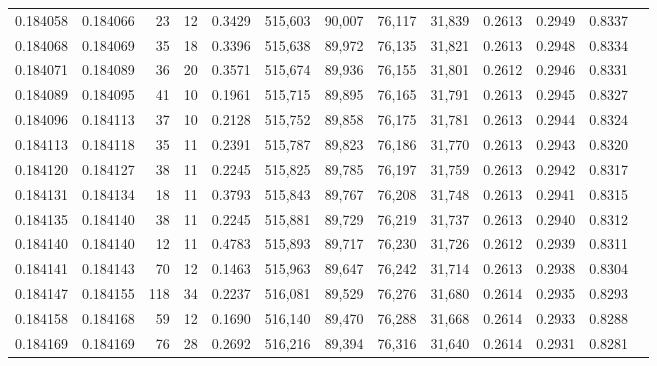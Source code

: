 \begin{tabular}{rrrrrrrrrrrrr}
0.184058 & 0.184066 &    23 &  12 &                                     0.3429 & 515,603 &  90,007 &  76,117 &  31,839 & 0.2613 & 0.2949 & 0.8337 \\
0.184068 & 0.184069 &    35 &  18 &                                     0.3396 & 515,638 &  89,972 &  76,135 &  31,821 & 0.2613 & 0.2948 & 0.8334 \\
0.184071 & 0.184089 &    36 &  20 &                                     0.3571 & 515,674 &  89,936 &  76,155 &  31,801 & 0.2612 & 0.2946 & 0.8331 \\
0.184089 & 0.184095 &    41 &  10 &                                     0.1961 & 515,715 &  89,895 &  76,165 &  31,791 & 0.2613 & 0.2945 & 0.8327 \\
0.184096 & 0.184113 &    37 &  10 &                                     0.2128 & 515,752 &  89,858 &  76,175 &  31,781 & 0.2613 & 0.2944 & 0.8324 \\
0.184113 & 0.184118 &    35 &  11 &                                     0.2391 & 515,787 &  89,823 &  76,186 &  31,770 & 0.2613 & 0.2943 & 0.8320 \\
0.184120 & 0.184127 &    38 &  11 &                                     0.2245 & 515,825 &  89,785 &  76,197 &  31,759 & 0.2613 & 0.2942 & 0.8317 \\
0.184131 & 0.184134 &    18 &  11 &                                     0.3793 & 515,843 &  89,767 &  76,208 &  31,748 & 0.2613 & 0.2941 & 0.8315 \\
0.184135 & 0.184140 &    38 &  11 &                                     0.2245 & 515,881 &  89,729 &  76,219 &  31,737 & 0.2613 & 0.2940 & 0.8312 \\
0.184140 & 0.184140 &    12 &  11 &                                     0.4783 & 515,893 &  89,717 &  76,230 &  31,726 & 0.2612 & 0.2939 & 0.8311 \\
0.184141 & 0.184143 &    70 &  12 &                                     0.1463 & 515,963 &  89,647 &  76,242 &  31,714 & 0.2613 & 0.2938 & 0.8304 \\
0.184147 & 0.184155 &   118 &  34 &                                     0.2237 & 516,081 &  89,529 &  76,276 &  31,680 & 0.2614 & 0.2935 & 0.8293 \\
0.184158 & 0.184168 &    59 &  12 &                                     0.1690 & 516,140 &  89,470 &  76,288 &  31,668 & 0.2614 & 0.2933 & 0.8288 \\
0.184169 & 0.184169 &    76 &  28 &                                     0.2692 & 516,216 &  89,394 &  76,316 &  31,640 & 0.2614 & 0.2931 & 0.8281 \\

\end{tabular}
